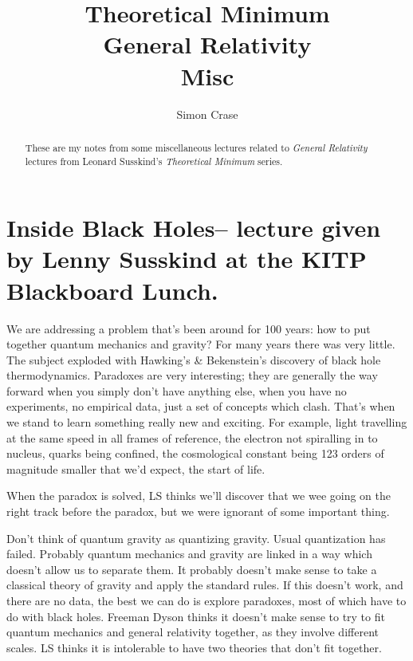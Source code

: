 \documentclass[]{article}
\title{Theoretical Minimum\\General Relativity\\Misc}
\author{Simon Crase}
\begin{document}
	
	\maketitle
	
	\begin{abstract}
		These are my notes from some miscellaneous lectures related to  \emph{General Relativity}\cite{susskind2012general} lectures from Leonard Susskind's \emph{Theoretical Minimum} series\cite{susskind2007theoretical}.
	\end{abstract}
	
	\tableofcontents
	\listoffigures
	\listoftables
	\listoftheorems

	\section{Inside Black Holes-- lecture given by Lenny Susskind at the KITP Blackboard Lunch.}\label{sec:inh}

We are addressing a problem that's been around for 100 years: how to put together quantum mechanics and gravity?  For many years there was very little. The subject exploded with Hawking's \& Bekenstein's discovery of black hole thermodynamics. Paradoxes are very interesting; they are generally the way forward when you simply don't have anything else, when you have no experiments, no empirical data, just a set of concepts which clash. That's when we stand to learn something really new and exciting. For example, light travelling at the same speed in all frames of reference, the electron not spiralling in to nucleus, quarks being confined, the cosmological constant being 123 orders of magnitude smaller that we'd expect, the start of life.\cite{susskind2013inside}

When the paradox is solved, LS thinks we'll discover that we wee going on the right track before the paradox, but we were ignorant of some important thing.

Don't think of quantum gravity as quantizing gravity. Usual quantization has failed. Probably quantum mechanics and gravity are linked in a way which doesn't allow us to separate them. It probably doesn't make sense to take a classical theory of gravity and apply the standard rules. If this doesn't work, and there are no data, the best we can do is explore paradoxes, most of which have to do with black holes. Freeman Dyson thinks it doesn't make sense to try to fit quantum mechanics and general relativity together, as they involve different scales. LS thinks it is intolerable to have two theories that don't fit together. 
\end{document}
